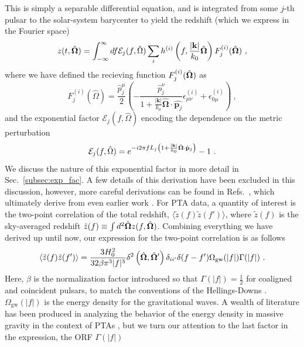 \documentclass[prd,aps,psfig,nofootinbib,nobibnotes,superscriptaddress,preprintnumbers,times]{revtex4-2}\setlength{\topmargin}{-14mm}
\begin{document}
This is simply a separable differential equation, and is integrated from some $j$-th pulsar to the solar-system barycenter to yield the redshift (which we express in the Fourier space)
\begin{equation}\label{eqn:redshift}
    z(t, \hat{\bf \Omega}) = \int_{-\infty}^\infty df \mathcal{E}_j(f, \hat{\Omega}) \sum_i h^{(i)}\left(f, \frac{|{\bf k}|}{k_0} \hat{\bf \Omega}\right)F^{(i)}_j(\hat{\bf \Omega}) \ ,
\end{equation}
where we have defined the recieving function $F^{(i)}_j(\hat{\bf \Omega}) $ as 
\begin{equation}\label{eqn:recieving}
    F^{(i)}_j(\hat{\Omega}) = \frac{\hat{p}^\mu_j}{2}\left(-\frac{\hat{p}^\nu_j}{1+\frac{|\boldsymbol{k}|}{k_0} \hat{\boldsymbol{\Omega}} \cdot \hat{\boldsymbol{p}_j}} \epsilon_{\mu \nu}^{(i)}+\epsilon_{0 \mu}^{(i)}\right) \ ,
\end{equation}
and the exponential factor $\mathcal{E}_j(f, \hat{\Omega})$ encoding the dependence on the metric perturbation
\begin{equation}
    \mathcal{E}_j(f, \hat{\Omega}) = e^{-i2\pi f L_j\left( 1 + \frac{|{\bf k}|}{k_0} \hat{\bf \Omega}\cdot \hat{\bf p}_j\right)} - 1 \ . 
\end{equation}
We discuss the nature of this exponential factor in more detail in Sec.\ \ref{subsec:exp_fac}. A few details of this derivation have been excluded in this discussion, however, more careful derivations can be found in Refs.\ \cite{Anholm:2008wy, Liang:2021bct}, which ultimately derive from even earlier work \cite{Detweiler:1979wn, Estabrook:1975jtn, Kaufmann:1970}.
For PTA data, a quantity of interest is the two-point correlation of the total redshift, $\langle \tilde{z}(f) \tilde{z}(f') \rangle$, where $\tilde{z}(f)$ is the sky-averaged redshift $\tilde{z}(f) \equiv \int d^2\hat{\bf \Omega} z(f, \hat{\bf \Omega})$. Combining everything we have derived up until now, our expression for the two-point correlation is as follows
\begin{equation}\label{eqn:two_point_z}
    \langle \tilde{z}(f) \tilde{z}(f') \rangle = \frac{3H_0^2}{32 \beta \pi^3|f|^3}\delta^2\left(\hat{\bf \Omega} , \hat{\bf \Omega}'\right)\delta_{ii'}\delta(f - f')\Omega_{\text{gw}}(|f|) \Gamma(|f|) \ .
\end{equation}
Here, $\beta$ is the normalization factor introduced so that $\Gamma(|f|) = \frac{1}{2}$ for coaligned and coincident pulsars, to match the conventions of the Hellings-Downs \cite{Romano:2023zhb}. $\Omega_{\text{gw}}(|f|)$ is the energy density for the gravitational waves. A wealth of literature has been produced in analyzing the behavior of the energy density in massive gravity in the context of PTAs \cite{Choi:2023tun, Wu:2023rib, Kenjale:2024rsc, He:2021bqm}, but we turn our attention to the last factor in the expression, the ORF $\Gamma(|f|)$ 
\end{document}
